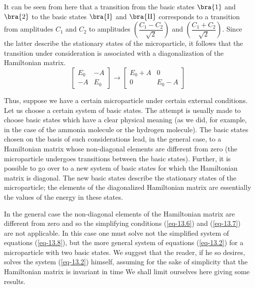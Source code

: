 \documentclass[a4paper,sfsidenotes,colorlinks=true]{tufte-book}
\numberwithin{equation}{section}
\numberwithin{figure}{section}
\begin{document}
It can be seen from here that a transition from the basic states
$\bra{1}$ and $\bra{2}$ to the basic states $\bra{\mathrm{I}}$ and
$\bra{\mathrm{II}}$ corresponds to a transition from amplitudes
$C_{1}$ and $C_{2}$ to amplitudes $\left( \dfrac{C_{1} -
    C_{2}}{\sqrt{2}} \right)$
and $\left( \dfrac{C_{1} + C_{2}}{\sqrt{2}}\right)$. Since the latter describe the
stationary states of the microparticle, it follows that the transition
under consideration is associated with a diagonalization of the
Hamiltonian matrix.
\begin{equation*}
\begin{bmatrix}
E_{0} & -A \\
-A & E_{0} 
\end{bmatrix}
\to 
\begin{bmatrix}
E_{0}+A & 0 \\
0 & E_{0}-A
\end{bmatrix}
\end{equation*}

Thus, suppose we have a certain microparticle under certain external
conditions. Let us choose a certain system of basic states. The
attempt is usually made to choose basic states which have a clear
physical meaning (as we did, for example, in the case of the ammonia
molecule or the hydrogen molecule). The basic states chosen on the
basis of such considerations lead, in the general case, to a
Hamiltonian matrix whose non-diagonal elements are different from zero
(the microparticle undergoes transitions between the basic
states). Further, it is possible to go over to a new system of basic
states for which the Hamiltonian matrix is diagonal. The new basic
states describe the stationary states of the microparticle; the
elements of the diagonalized Hamiltonian matrix are essentially the
values of the energy in these states.


In the general case the non-diagonal elements
of the Hamiltonian matrix are different from zero and so the
simplifying conditions (\ref{eq-13.6}) and (\ref{eq-13.7}) are not
applicable. In this case one must solve not the simplified system of
equations (\ref{eq-13.8}), but the more general system of equations
(\ref{eq-13.2}) for a microparticle with two basic states. We suggest
that the reader, if he so desires, solves the system (\ref{eq-13.2})
himself, assuming for the sake of simplicity that the Hamiltonian
matrix is invariant in time We shall limit ourselves
here giving some results.
\end{document}

